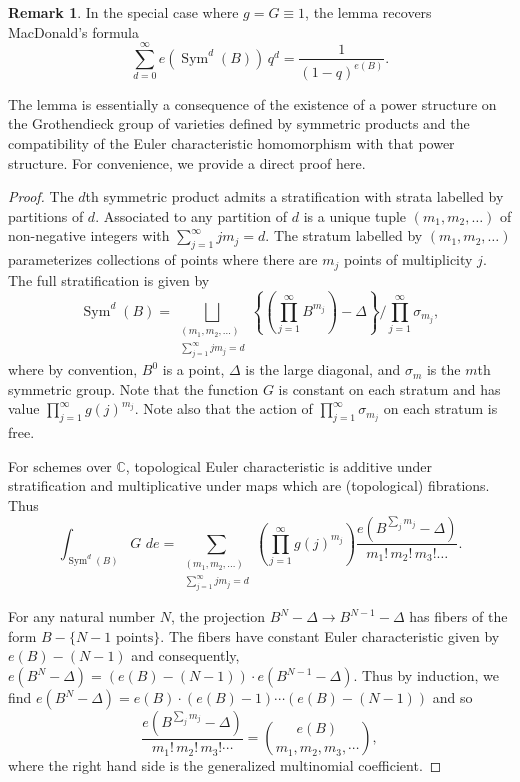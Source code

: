 \documentclass[12pt]{amsart}
\theoremstyle{definition}
\newtheorem{remark}[theorem]{Remark}
\newcommand{\CC} {\mathbb{C}}          %
\newcommand{\Sym}{\operatorname{Sym}}
\begin{document}
\begin{remark} \label{MacD}
In the special case where $g=G\equiv  1$, the lemma recovers
MacDonald's formula $$\sum _{d=0}^{\infty }e (\Sym ^{d} (B)) \, q^{d} =
\frac{1}{(1-q)^{e (B)}}.$$ 

The lemma is essentially a consequence of the existence of a power
structure on the Grothendieck group of varieties defined by
symmetric products and the compatibility of the Euler characteristic
homomorphism with that power structure. For convenience, we provide a
direct proof here.
\end{remark}
\begin{proof}
The $d$th symmetric product admits a stratification with strata
labelled by partitions of $d$. Associated to any partition of $d$ is a
unique tuple $(m_{1},m_{2},\dots )$ of non-negative integers with
$\sum _{j=1}^{\infty }j m_{j}=d$. The stratum labelled by
$(m_{1},m_{2},\dots )$ parameterizes collections of points where there
are $m_{j}$ points of multiplicity $j$. The full stratification is
given by
\[
\Sym ^{d} (B) = \bigsqcup_{\begin{smallmatrix} (m_{1},m_{2},\dots )\\
\sum _{j=1}^{\infty }j m_{j}=d  \end{smallmatrix}} \left\{\left(\prod _{j=1}^{\infty }B^{m_{j}} \right) -\Delta  \right\}/ \prod _{j=1}^{\infty }\sigma _{m_{j}}, 
\]
where by convention, $B^{0}$ is a point, $\Delta $ is the large
diagonal, and $\sigma _{m}$ is the $m$th symmetric group. Note that
the function $G$ is constant on each stratum and has value $\prod
_{j=1}^{\infty }g (j)^{m_{j}}$. Note also that the action of $\prod
_{j=1}^{\infty }\sigma _{m_{j}}$ on each stratum is free. 

For schemes over $\CC $, topological Euler characteristic is additive
under stratification and multiplicative under maps which are
(topological) fibrations. Thus
\[
\int _{\Sym ^{d} (B)} G\,\, de = \sum _{\begin{smallmatrix}(m_{1},m_{2},\dots )\\
\sum _{j=1}^{\infty }j m_{j}=d   \end{smallmatrix}} \left(\prod _{j=1}^{\infty } g (j)^{m_{j}} \right) \frac{e (B^{\sum _{j}m_{j}}-\Delta )}{m_{1}!\, m_{2}!\, m_{3}!\dots }.
\]

For any natural number $N$, the projection $B^{N}-\Delta \to
B^{N-1}-\Delta $ has fibers of the form $B-\{N-1\text{ points}
\}$. The fibers have constant Euler characteristic given by $e (B)-
(N-1)$ and consequently, $e (B^{N}-\Delta )= (e (B)- (N-1))\cdot e
(B^{N-1}-\Delta )$. Thus by induction, we find $e (B^{N}-\Delta ) = e
(B)\cdot (e (B)-1)\cdots (e (B)- (N-1))$ and so 
\[
\frac{e (B^{\sum _{j}m_{j}}-\Delta )}{m_{1}!\,m_{2}!\,m_{3}!\cdots } = \binom{e (B)}{m_{1},m_{2},m_{3},\cdots },
\]
where the right hand side is the generalized multinomial coefficient.


\end{proof}
\end{document}
